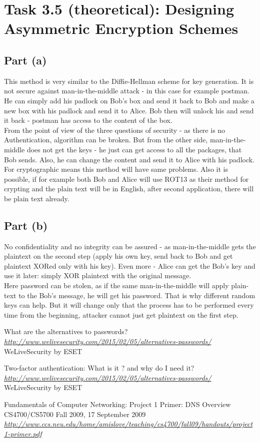 \documentclass{article}
\begin{document}
\section*{Task 3.5 (theoretical): Designing Asymmetric Encryption Schemes}
\subsection*{Part (a)}
This method is very similar to the Diffie-Hellman scheme for key generation. It is not secure against man-in-the-middle attack - in this case for example postman. He can simply add his padlock on Bob's box and send it back to Bob and make a new box with his padlock and send it to Alice. Bob then will unlock his and send it back - postman has access to the content of the box. 
\\
From the point of view of the three questions of security - as there is no Authentication, algorithm can be broken. But from the other side, man-in-the-middle does not get the keys - he just can get access to all the packages, that Bob sends. Also, he can change the content and send it to Alice with his padlock.
\\
For cryptographic means this method will have same problems. Also it is possible, if for example both Bob and Alice will use ROT13 as their method for crypting and the plain text will be in English, after second application, there will be plain text already.

\subsection*{Part (b)}
No confidentiality and no integrity can be assured - as man-in-the-middle gets the plaintext on the second step (apply his own key, send back to Bob and get plaintext XORed only with his key). Even more - Alice can get the Bob's key and use it later: simply XOR plaintext with the original message.
\\
Here password can be stolen, as if the same man-in-the-middle will apply plain-text to the Bob's message, he will get his password. That is why different random keys can help. But it will change only that the process has to be performed every time from the beginning, attacker cannot just get plaintext on the first step.

\begin{thebibliography}{9}

  What are the alternatives to passwords?
  \emph{\url{http://www.welivesecurity.com/2015/02/05/alternatives-passwords/}}
  WeLiveSecurity by ESET
  
  Two-factor authentication: What is it ? and why do I need it?
  \emph{\url{http://www.welivesecurity.com/2015/02/05/alternatives-passwords/}}
  WeLiveSecurity by ESET

 Fundamentals of Computer Networking: Project 1 Primer: DNS Overview
 CS4700/CS5700 Fall 2009, 17 September 2009
 \emph{\url{http://www.ccs.neu.edu/home/amislove/teaching/cs4700/fall09/handouts/project1-primer.pdf}}

\end{thebibliography}
\end{document}

